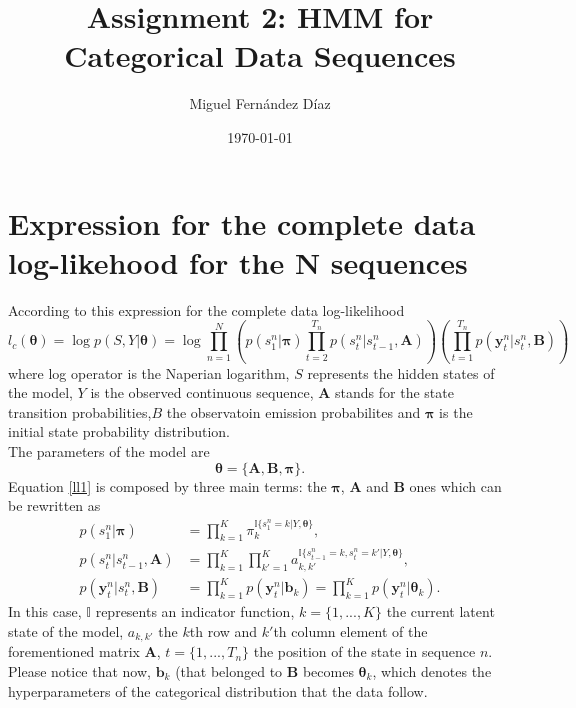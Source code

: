 \documentclass[12pt]{article}%
\newcommand{\indicator}{\mathbb{I}}
\begin{document}
\title{Assignment 2: HMM for Categorical Data Sequences}
\author{Miguel Fern\'{a}ndez D\'{i}az}
\date{\today}
\maketitle
\section{Expression for the complete data log-likehood for the N sequences}
According to this expression for the complete data log-likelihood
\begin{equation}
\label{ll1}
l_{c}\left(\boldsymbol\theta\right) = \log p ( S , Y | \boldsymbol\theta ) = \log \prod _ { n = 1 } ^ { N } \left( p \left( s _ { 1 } ^ { n } | \boldsymbol\pi \right) \prod _ { t = 2 } ^ { T _ { n } } p \left( s _ { t } ^ { n } | s _ { t - 1 } ^ { n } , \mathbf { A } \right) \right) \left( \prod _ { t = 1 } ^ { T _ { n } } p \left( \mathbf { y } _ { t } ^ { n } | s _ { t } ^ { n } , \mathbf { B } \right) \right)
\end{equation}
where log operator is the Naperian logarithm, $S$ represents the hidden states of the model, $Y$ is the observed continuous sequence, $\mathbf { A }$ stands for the state transition probabilities,$B$ the observatoin emission probabilites and $\boldsymbol\pi$ is the initial state probability distribution. \\

\noindent The parameters of the model are
\begin{equation}
\boldsymbol\theta = \{ \mathbf { A } , \mathbf { B } , \boldsymbol\pi \}.
\end{equation}
Equation \eqref{ll1} is composed by three main terms: the $\boldsymbol\pi$, $\mathbf { A }$ and $\mathbf { B } $ ones which can be rewritten as
\begin{align}
p \left( s _ { 1 } ^ { n } | \boldsymbol\pi \right) &= \prod\limits_{k=1}^{K}\pi_{k}^{\indicator \lbrace s_{1}^{n}=k|Y,\boldsymbol\theta\rbrace},\\
p \left( s _ { t } ^ { n } | s _ { t - 1 } ^ { n } , \mathbf { A } \right) &= \prod\limits_{k=1}^{K} \prod\limits_{k'=1}^{K}a_{k,k'}^{\indicator \lbrace s_{t-1}^{n}=k,s_{t}^{n}=k'|Y,\boldsymbol\theta\rbrace},\\
p \left( \mathbf { y } _ { t } ^ { n } | s _ { t } ^ { n } , \mathbf { B } \right) &= \prod\limits_{k=1}^{K} p \left( \mathbf { y } _ { t } ^ { n } | \boldsymbol b_{k} \right) = \prod\limits_{k=1}^{K} p \left( \mathbf { y } _ { t } ^ { n } | \boldsymbol\theta_{k} \right) \label{p3LL}.
\end{align}
In this case, $\indicator$ represents an indicator function, $k = \lbrace{1,...,K}\rbrace$ the current latent state of the model, $a_{k,k'}$ the $k$th row and $k'$th column element of the forementioned matrix $\mathbf { A }$, $t = \lbrace{1,...,T_{n}}\rbrace$ the position of the state in sequence $n$. Please notice that now, $\mathbf{b}_{k}$ (that belonged to $\mathbf{B}$ becomes $\boldsymbol\theta_{k}$, which denotes the hyperparameters of the categorical distribution that the data follow.\\
\end{document}
